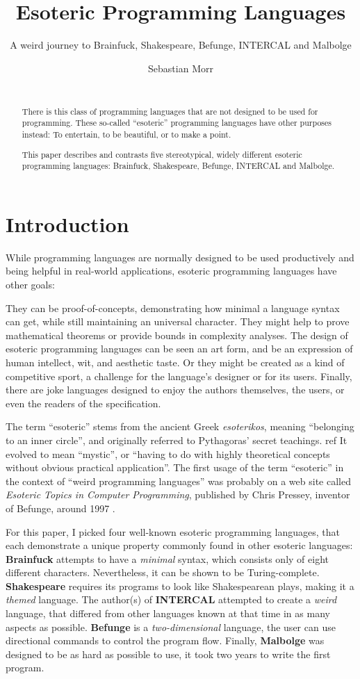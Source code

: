 \documentclass{sig-alternate}
\title{Esoteric Programming Languages}
\subtitle{A weird journey to Brainfuck, Shakespeare, Befunge, INTERCAL and Malbolge}
\author{\alignauthor Sebastian Morr\\\affaddr{Technical University Braunschweig}\\\email{sebastian@morr.cc}}
\begin{document}
\maketitle

\begin{abstract}
    There is this class of programming languages that are not designed to be used for programming. These so-called “esoteric” programming languages have other purposes instead: To entertain, to be beautiful, or to make a point.

    This paper describes and contrasts five stereotypical, widely different esoteric programming languages: Brainfuck, Shakespeare, Befunge, INTERCAL and Malbolge.
\end{abstract}

\section{Introduction}

While programming languages are normally designed to be used productively and being helpful in real-world applications, esoteric programming languages have other goals:

They can be proof-of-concepts, demonstrating how minimal a language syntax can get, while still maintaining an universal character. They might help to prove mathematical theorems or provide bounds in complexity analyses. The design of esoteric programming languages can be seen an art form, and be an expression of human intellect, wit, and aesthetic taste. Or they might be created as a kind of competitive sport, a challenge for the language's designer or for its users. Finally, there are joke languages designed to enjoy the authors themselves, the users, or even the readers of the specification.

The term “esoteric” stems from the ancient Greek \emph{esoterikos}, meaning “belonging to an inner circle”, and originally referred to Pythagoras' secret teachings. ref It evolved to mean “mystic”, or “having to do with highly theoretical concepts without obvious practical application”. The first usage of the term “esoteric” in the context of “weird programming languages” was probably on a web site called \emph{Esoteric Topics in Computer Programming}, published by Chris Pressey, inventor of Befunge, around 1997 \cite{pressey2005chris}.

For this paper, I picked four well-known esoteric programming languages, that each demonstrate a unique property commonly found in other esoteric languages: \textbf{Brainfuck} attempts to have a \textit{minimal} syntax, which consists only of eight different characters. Nevertheless, it can be shown to be Turing-complete. \textbf{Shakespeare} requires its programs to look like Shakespearean plays, making it a \textit{themed} language. The author(s) of \textbf{INTERCAL} attempted to create a \textit{weird} language, that differed from other languages known at that time in as many aspects as possible. \textbf{Befunge} is a \textit{two-dimensional} language, the user can use directional commands to control the program flow. Finally, \textbf{Malbolge} was designed to be as hard as possible to use, it took two years to write the first program.
\end{document}
